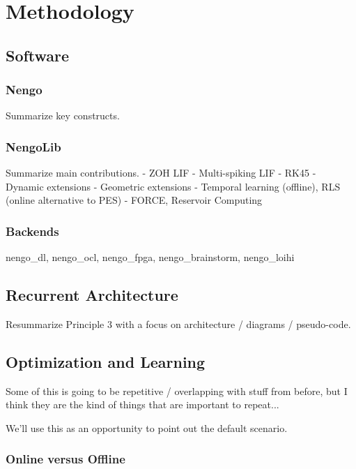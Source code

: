 \chapter{Methodology}
\label{chapt:methodology}


\section{Software}

\subsection{Nengo}

Summarize key constructs.

\subsection{NengoLib}

Summarize main contributions.
 - ZOH LIF
 - Multi-spiking LIF
 - RK45
 - Dynamic extensions
 - Geometric extensions
 - Temporal learning (offline), RLS (online alternative to PES)
 - FORCE, Reservoir Computing

\subsection{Backends}

nengo\_dl, nengo\_ocl, nengo\_fpga, nengo\_brainstorm, nengo\_loihi


\section{Recurrent Architecture}

Resummarize Principle 3 with a focus on architecture / diagrams / pseudo-code.


\section{Optimization and Learning}

Some of this is going to be repetitive / overlapping with stuff from before, but I think they are the kind of things that are important to repeat...

We'll use this as an opportunity to point out the default scenario.

\subsection{Online versus Offline}


